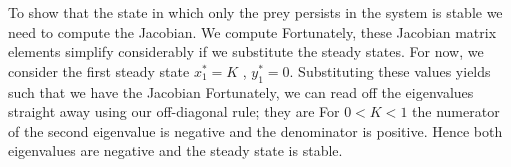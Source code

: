 To show that the state in which only the prey persists in the system is stable we need to compute the Jacobian. We compute 
Fortunately, these Jacobian matrix elements simplify considerably if we substitute the steady states. For now, we consider the first steady state 
$x_1^*=K$ , $y_1^*=0$. Substituting these values yields 
such that we have the Jacobian 
Fortunately, we can read off the eigenvalues straight away using our 
off-diagonal rule; they are
For $0<K<1$ the numerator of the second eigenvalue is negative and the denominator is positive. Hence both eigenvalues are negative and the 
steady state is stable.

